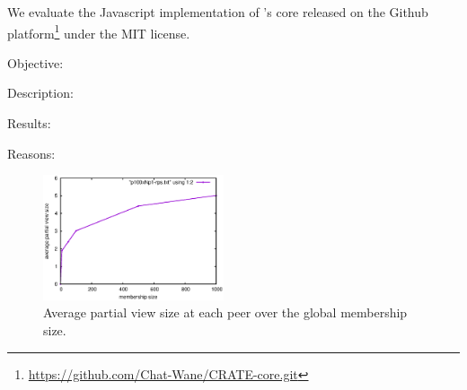 We evaluate the Javascript implementation of \CRATE's core released on the
Github platform\footnote{\url{https://github.com/Chat-Wane/CRATE-core.git}}
under the MIT license.
\ \\

\begin{asparadesc}
\item [Objective:]
\item [Description:]
\item [Results:]
\item [Reasons:]
\end{asparadesc}

\begin{figure}
  \centering
  \includegraphics[width=0.475\textwidth]{./img/partialview.eps}
  \caption{\label{fig:partialview} Average partial view size at each peer over
  the global membership size.}
\end{figure}


